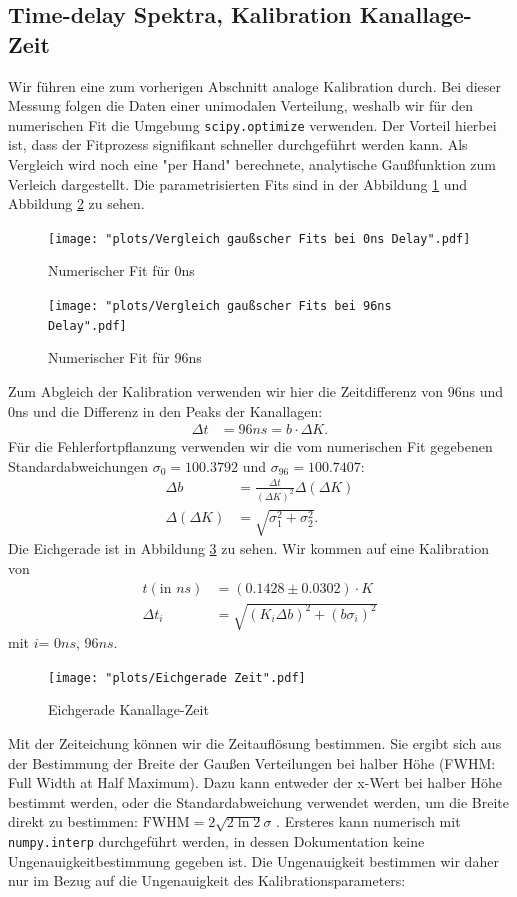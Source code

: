 \documentclass[%
aps,
onecolumn,
11pt,
tightenlines,
nofootinbib,
superscriptaddress,
floatfix,
prd,
]{revtex4-2}
\begin{document}
\subsection{Time-delay Spektra, Kalibration Kanallage-Zeit}
Wir führen eine zum vorherigen Abschnitt analoge Kalibration durch. Bei dieser Messung folgen die Daten einer unimodalen Verteilung, weshalb wir für den numerischen Fit die Umgebung \texttt{scipy.optimize} verwenden. Der Vorteil hierbei ist, dass der Fitprozess signifikant schneller durchgeführt werden kann. Als Vergleich wird noch eine "per Hand" berechnete, analytische Gaußfunktion zum Verleich dargestellt. Die parametrisierten Fits sind in der Abbildung \ref{fig:timedelay} und Abbildung \ref{fig:timedelay96} zu sehen. 
\begin{figure}[H]
	\centering
	\texttt{[image: "plots/Vergleich gaußscher Fits bei 0ns Delay".pdf]}
	\caption{Numerischer Fit für 0ns}
	\label{fig:timedelay}
\end{figure}
\begin{figure}[H]
	\centering
	\texttt{[image: "plots/Vergleich gaußscher Fits bei 96ns Delay".pdf]}
	\caption{Numerischer Fit für 96ns}
	\label{fig:timedelay96}
\end{figure}
Zum Abgleich der Kalibration verwenden wir hier die Zeitdifferenz von $96$ns und $0$ns und die Differenz in den Peaks der Kanallagen:
\begin{align}
	\Delta t &= 96ns = b \cdot \Delta K. 
\end{align}
Für die Fehlerfortpflanzung verwenden wir die vom numerischen Fit gegebenen Standardabweichungen $\sigma_{0}=100.3792$ und $\sigma_{96}= 100.7407$:
\begin{align}
    \Delta b &= \frac{\Delta t}{(\Delta K)^2} \Delta(\Delta K) \\
    \Delta (\Delta K) &= \sqrt{ \sigma_1^2 + \sigma_2^2 }.
\end{align}
Die Eichgerade ist in Abbildung \ref{fig:timecalibrate} zu sehen. Wir kommen auf eine Kalibration von
\begin{align}
	t (\text{in $ns$})&= (0.1428 \pm 0.0302) \cdot K \\
	\Delta t_{i} &= \sqrt{ (K_i \Delta b)^2 + (b \sigma_i)^2 }
\end{align}
mit $i $= 0$ns$, 96$ns$.
\begin{figure}[H]
	\centering
	\texttt{[image: "plots/Eichgerade Zeit".pdf]}
	\caption{Eichgerade Kanallage-Zeit}
	\label{fig:timecalibrate}
\end{figure}
Mit der Zeiteichung können wir die Zeitauflösung bestimmen. Sie ergibt sich aus der Bestimmung der Breite der Gaußen Verteilungen bei halber Höhe (FWHM: Full Width at Half Maximum). Dazu kann entweder der x-Wert bei halber Höhe bestimmt werden, oder die Standardabweichung verwendet werden, um die Breite direkt zu bestimmen: $\text{FWHM} =2 \sqrt{2\ln 2}\sigma$ \cite{FWHM}. Ersteres kann numerisch mit \texttt{numpy.interp} durchgeführt werden, in dessen Dokumentation keine Ungenauigkeitbestimmung gegeben ist. Die Ungenauigkeit bestimmen wir daher nur im Bezug auf die Ungenauigkeit des Kalibrationsparameters:
\end{document}
